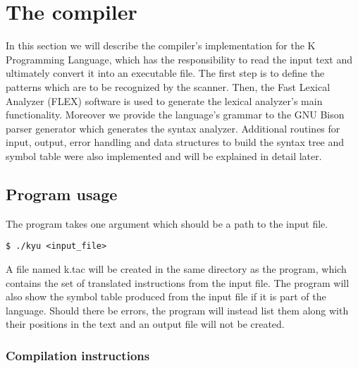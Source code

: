 \section{The compiler}
In this section we will describe the compiler's implementation for the K Programming Language,
which has the responsibility to read the input text and ultimately convert it into an
executable file. The first step is to define the patterns which are to be recognized by the scanner.
Then, the Fast Lexical Analyzer (FLEX) \cite{FLEX} software is used to generate the lexical
analyzer's main functionality. Moreover we provide the language's grammar to the GNU Bison parser
generator \cite{BISON} which generates the syntax analyzer. Additional routines for input, output,
error handling and data structures to build the syntax tree and symbol table were also implemented
and will be explained in detail later.


\subsection{Program usage}
The program takes one argument which should be a path to the input file.

\begin{lstlisting}
$ ./kyu <input_file>
\end{lstlisting}

A file named k.tac will be created in the same directory as the program,
which contains the set of translated instructions from the input file.
The program will also show the symbol table produced from the input file
if it is part of the language. Should there be errors, the program will
instead list them along with their positions in the text and an output
file will not be created.

\subsubsection{Compilation instructions}

